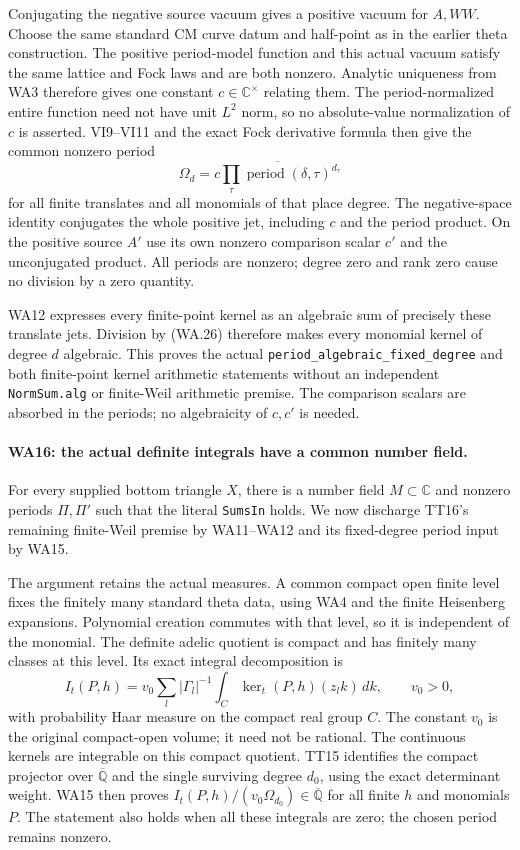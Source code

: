 Conjugating the negative source vacuum gives a positive vacuum
for $A,WW$.  Choose the same standard CM curve datum and half-point
as in the earlier theta construction.  The positive period-model
function and this actual vacuum satisfy the same lattice and Fock
laws and are both nonzero.  Analytic uniqueness from WA3 therefore
gives one constant $c\in\mathbb C^{\times}$ relating them.  The
period-normalized entire function need not have unit $L^2$ norm,
so no absolute-value normalization of $c$ is asserted.
VI9--VI11 and the exact Fock derivative formula then give the
common nonzero period
\[
          \Omega_d=\overline{c\prod_\tau
                      \operatorname{period}(\delta,\tau)^{d_\tau}}
                                                               \tag{WA.26}
\]
for all finite translates and all monomials of that place degree.
The negative-space identity conjugates the whole positive jet,
including $c$ and the period product.  On the positive source
$A'$ use its own nonzero comparison scalar $c'$ and the unconjugated
product.  All periods are nonzero; degree zero and rank zero
cause no division by a zero quantity.

WA12 expresses every finite-point kernel as an algebraic sum
of precisely these translate jets.  Division by (WA.26) therefore
makes every monomial kernel of degree $d$ algebraic.  This proves
the actual \texttt{period\_algebraic\_fixed\_degree} and both
finite-point kernel arithmetic statements without an independent
\texttt{NormSum.alg} or finite-Weil arithmetic premise.  The
comparison scalars are absorbed in the periods; no algebraicity
of $c,c'$ is needed.

\paragraph{WA16: the actual definite integrals have a common number field.}
For every supplied bottom triangle $X$, there is a number field
$M\subset\mathbb C$ and nonzero periods $\Pi,\Pi'$ such that
the literal \texttt{SumsIn} holds.  We now discharge TT16's
remaining finite-Weil premise by WA11--WA12 and its fixed-degree
period input by WA15.

The argument retains the actual measures.  A common compact open
finite level fixes the finitely many standard theta data, using
WA4 and the finite Heisenberg expansions.  Polynomial creation
commutes with that level, so it is independent of the monomial.
The definite adelic quotient is compact and has finitely many
classes at this level.  Its exact integral decomposition is
\[
 I_t(P,h)=v_0\sum_l|\Gamma_l|^{-1}
       \int_C\operatorname{ker}_t(P,h)(z_lk)\,dk,
                 \qquad v_0>0,                             \tag{WA.27}
\]
with probability Haar measure on the compact real group $C$.
The constant $v_0$ is the original compact-open volume; it need
not be rational.  The continuous kernels are integrable on this
compact quotient.  TT15 identifies the compact projector over
$\overline{\mathbb Q}$ and the single surviving degree $d_0$,
using the exact determinant weight.  WA15 then proves
$I_t(P,h)/(v_0\Omega_{d_0})\in\overline{\mathbb Q}$ for all
finite $h$ and monomials $P$.  The statement also holds when all
these integrals are zero; the chosen period remains nonzero.

